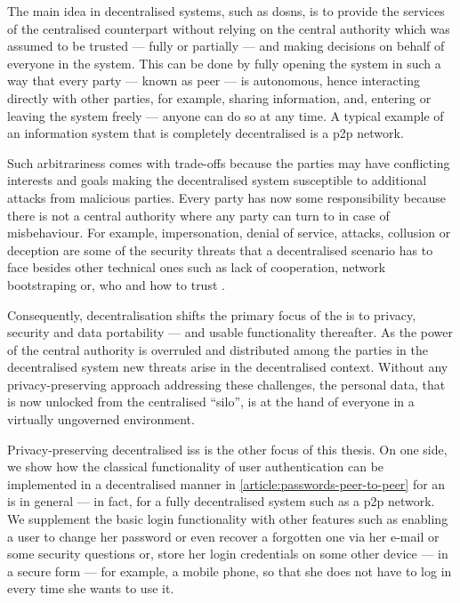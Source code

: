 \documentclass[showtrims,oldfontcommands]{kthesis}
\begin{document}
The main idea in decentralised systems, such as \acp{dosn}, is to provide the services 
of the centralised counterpart without relying on the central authority which was 
assumed to be trusted --- fully or partially --- and making decisions on behalf 
of everyone in the system. This can be done by fully opening the system in such 
a way that every party --- known as peer --- is autonomous, hence interacting directly 
with other parties, for example, sharing information, and, entering or leaving the 
system freely --- anyone can do so at any time. A typical example of an information 
system that is completely decentralised is a \ac{p2p} network.

Such arbitrariness comes with trade-offs because the parties may have conflicting 
interests and goals making the decentralised system susceptible to additional attacks 
from malicious parties. Every party has now some responsibility because there is 
not a central authority where any party can turn to in case of misbehaviour. For 
example, impersonation, denial of service, \Sybil attacks, collusion or deception 
are some of the security threats that a decentralised scenario has to face besides 
other technical ones such as lack of cooperation, network bootstraping or, who and 
how to trust \cite{BucheggerA09}.

Consequently, decentralisation shifts the primary focus of the \ac{is} 
to privacy, security and data portability --- and usable functionality thereafter. 
As the power of the central authority is overruled and distributed among the parties 
in the decentralised system new threats arise in the decentralised context. Without 
any privacy-preserving approach addressing these challenges, the personal data, 
that is now unlocked from the centralised ``silo'', is at the hand of everyone in 
a virtually ungoverned environment.

Privacy-preserving decentralised \acp{is} is the other focus of this 
thesis. On one side, we show how the classical functionality of user authentication 
can be implemented in a decentralised manner in \cref{article:passwords-peer-to-peer} 
for an \ac{is} in general --- in fact, for a fully decentralised system 
such as a \ac{p2p} network. We supplement the basic login functionality with other 
features such as enabling a user to change her password or even recover a forgotten 
one via her e-mail or some security questions or, store her login credentials on 
some other device --- in a secure form --- for example, a mobile phone, so that 
she does not have to log in every time she wants to use it.
\end{document}
